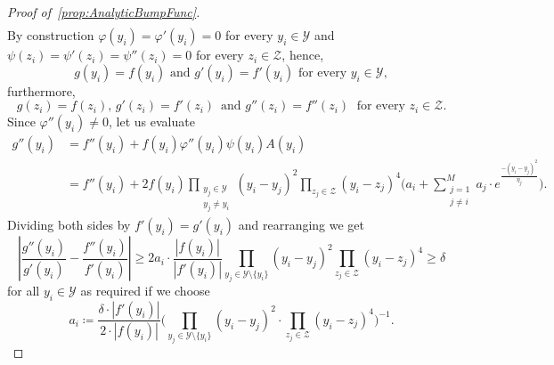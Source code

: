 \documentclass[12pt,]{article}
\theoremstyle{definition}
\theoremstyle{remark}
\newcommand{\0}{\mathbf{0}}
\begin{document}
{\begin{proof}[Proof of~\cref{prop:AnalyticBumpFunc}]
\begin{align*}
\end{align*}
By construction $\varphi(y_i) = \varphi'(y_i) =0$ for every $ y_i\in\mathcal{Y}$ and $\psi(z_i) = \psi'(z_i) = \psi''(z_i)=0$ for every $z_i\in\mathcal{Z}$, hence,
\begin{equation*}
	g(y_i)=f(y_i) \text{ and } g'(y_i)=f'(y_i) \text{ for every } y_i\in\mathcal{Y},
\end{equation*}
furthermore,
\begin{equation*}
	g(z_i)=f(z_i),\, g'(z_i)=f'(z_i) \,\text{ and } g''(z_i)=f''(z_i) \;\text{ for every } z_i\in\mathcal{Z}.
\end{equation*}
Since $\varphi''(y_i)\neq 0$, let us evaluate
\begin{align*}
	g''(y_i) &= f''(y_i) + f(y_i)\varphi''(y_i)\psi(y_i)A(y_i) \\
	&=  f''(y_i) + 2f(y_i) \prod_{\substack{y_j\in\mathcal{Y}\\ y_j\neq y_i}} (y_i-y_j)^2  \prod_{z_j\in\mathcal{Z}} (y_i-z_j)^4 \bigg( a_i+ \sum_{\substack{j=1 \\ j\neq i}}^{M} a_j\cdot e^{\frac{-(y_i-y_j)^2}{\eta_j}} \bigg).
\end{align*}
Dividing both sides by $f'(y_i)=g'(y_i)$ and rearranging we get
\begin{equation*}
	\left| \frac{g''(y_i)}{g'(y_i)} - \frac{f''(y_i)}{f'(y_i)} \right|\geq 2a_i\cdot \frac{|f(y_i)|}{|f'(y_i)|}\prod_{y_j\in\mathcal{Y}\setminus\{y_i\}} (y_i-y_j)^2  \prod_{z_j\in\mathcal{Z}} (y_i-z_j)^4 \geq \delta
\end{equation*}
for all $y_i\in\mathcal{Y}$ as required if we choose
\begin{equation}\label{eq:a_iChoice}
	a_i \coloneqq \frac{\delta \cdot |f'(y_i)|}{2  \cdot |f(y_i)|} \Big(\prod_{y_j\in\mathcal{Y}\setminus\{y_i\}} (y_i - y_j)^2 \cdot \prod_{z_j\in\mathcal{Z}} (y_i - z_j)^4 \Big)^{-1}.
\end{equation}


\end{proof}}
\end{document}
